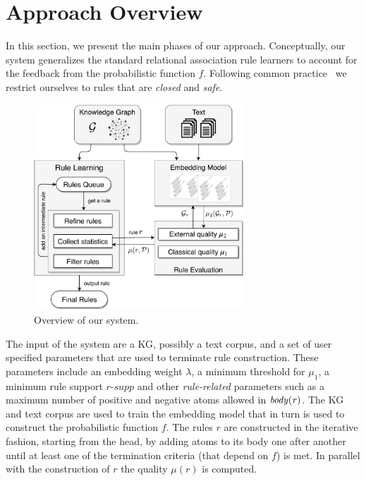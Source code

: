 \section{Approach Overview} 
\label{sec:sys}

In this section, we present the main phases of our approach. 
Conceptually, our system generalizes the standard relational association rule learners \cite{amie,DBLP:conf/esf/GoethalsB02} to account for the feedback from the probabilistic function $f$. 
Following common practice~\cite{amie} we restrict ourselves to rules that are \emph{closed} and \emph{safe}.

\begin{figure}[t]
\centering
\includegraphics[width=0.7\textwidth]{figures/system_overview_V.pdf}
\caption{Overview of our system.}\label{fig:system}
\end{figure}

The input of the system are a KG, possibly a text corpus, and a set of user specified parameters that are used to terminate rule construction.
These parameters include an embedding weight $\lambda$, 
a minimum threshold %
for $\mu_1$,  
a minimum rule support $\textit{r-supp}$ %
and other \emph{rule-related} parameters such as a maximum number of positive %
and negative %
atoms allowed in $\mathit{body(r)}$.
The KG and text corpus are used to train the embedding model that in turn is used to construct the probabilistic function $f$.
The rules $r$ are constructed in the iterative fashion, starting from the head, by adding atoms to its body one after another until at least one of the termination criteria (that depend on $f$) is met.
In parallel with the construction of $r$ the quality $\mu(r)$ is computed.

